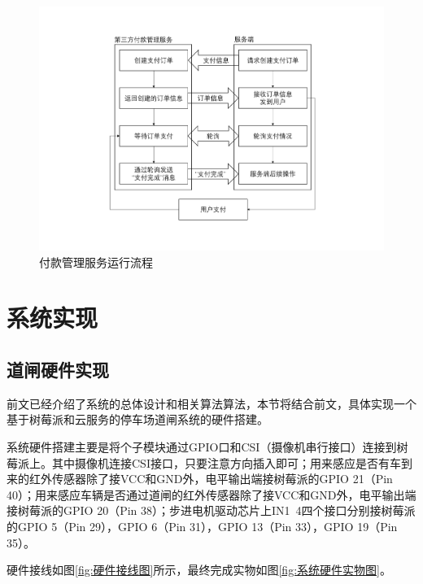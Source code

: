 \documentclass[a4paper]{ctexart}
\begin{document}
\begin{figure}[htbp]
	\centering
	\includegraphics[width=\textwidth]{figure/server-alipay.pdf}
	\caption{付款管理服务运行流程}\label{fig:付款管理服务运行流程}
\end{figure}

\section{系统实现}
\subsection{道闸硬件实现}
前文已经介绍了系统的总体设计和相关算法算法，本节将结合前文，具体实现一个基于树莓派和云服务的停车场道闸系统的硬件搭建。

系统硬件搭建主要是将个子模块通过GPIO口和CSI（摄像机串行接口）连接到树莓派上。其中摄像机连接CSI接口，只要注意方向插入即可；用来感应是否有车到来的红外传感器除了接VCC和GND外，电平输出端接树莓派的GPIO 21（Pin 40）；用来感应车辆是否通过道闸的红外传感器除了接VCC和GND外，电平输出端接树莓派的GPIO 20（Pin 38）；步进电机驱动芯片上IN1~4四个接口分别接树莓派的GPIO 5（Pin 29），GPIO 6（Pin 31），GPIO 13（Pin 33），GPIO 19（Pin 35）。

硬件接线如图\ref{fig:硬件接线图}所示，最终完成实物如图\ref{fig:系统硬件实物图}。
\end{document}
